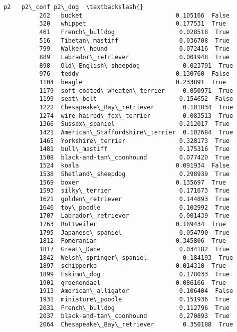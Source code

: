\documentclass[11pt]{article}
\begin{document}
\begin{Verbatim}[commandchars=\\\{\}]
                                            p2   p2\_conf p2\_dog  \textbackslash{}
          262   bucket                          0.105166  False   
          320   whippet                         0.177531  True    
          461   French\_bulldog                  0.028518  True    
          516   Tibetan\_mastiff                 0.036708  True    
          799   Walker\_hound                    0.072416  True    
          889   Labrador\_retriever              0.001948  True    
          898   Old\_English\_sheepdog            0.023791  True    
          976   teddy                           0.130760  False   
          1104  beagle                          0.233891  True    
          1179  soft-coated\_wheaten\_terrier     0.050971  True    
          1199  seat\_belt                       0.154652  False   
          1222  Chesapeake\_Bay\_retriever        0.101834  True    
          1274  wire-haired\_fox\_terrier         0.083513  True    
          1366  Sussex\_spaniel                  0.212017  True    
          1421  American\_Staffordshire\_terrier  0.102684  True    
          1465  Yorkshire\_terrier               0.328173  True    
          1481  bull\_mastiff                    0.175316  True    
          1508  black-and-tan\_coonhound         0.077420  True    
          1524  koala                           0.091934  False   
          1538  Shetland\_sheepdog               0.298939  True    
          1569  boxer                           0.135697  True    
          1593  silky\_terrier                   0.171673  True    
          1621  golden\_retriever                0.144893  True    
          1646  toy\_poodle                      0.102992  True    
          1707  Labrador\_retriever              0.001439  True    
          1763  Rottweiler                      0.189434  True    
          1795  Japanese\_spaniel                0.054790  True    
          1812  Pomeranian                      0.345806  True    
          1817  Great\_Dane                      0.034182  True    
          1842  Welsh\_springer\_spaniel          0.184193  True    
          1897  schipperke                      0.014310  True    
          1899  Eskimo\_dog                      0.178033  True    
          1901  groenendael                     0.086166  True    
          1913  American\_alligator              0.106404  False   
          1931  miniature\_poodle                0.151936  True    
          2031  French\_bulldog                  0.112796  True    
          2037  black-and-tan\_coonhound         0.270893  True    
          2064  Chesapeake\_Bay\_retriever        0.350188  True    

\end{Verbatim}
\end{document}
